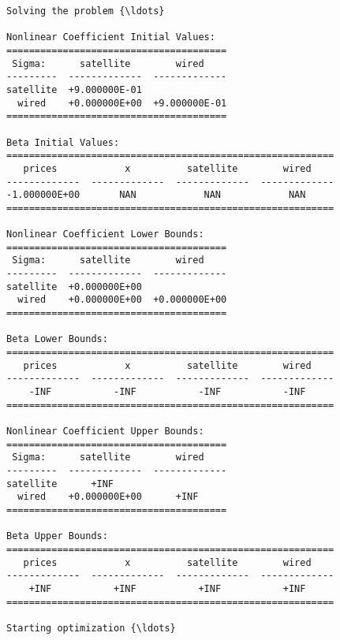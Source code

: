     \begin{Verbatim}[commandchars=\\\{\}]
Solving the problem {\ldots}

Nonlinear Coefficient Initial Values:
=======================================
 Sigma:      satellite        wired
---------  -------------  -------------
satellite  +9.000000E-01
  wired    +0.000000E+00  +9.000000E-01
=======================================

Beta Initial Values:
==========================================================
   prices            x          satellite        wired
-------------  -------------  -------------  -------------
-1.000000E+00       NAN            NAN            NAN
==========================================================

Nonlinear Coefficient Lower Bounds:
=======================================
 Sigma:      satellite        wired
---------  -------------  -------------
satellite  +0.000000E+00
  wired    +0.000000E+00  +0.000000E+00
=======================================

Beta Lower Bounds:
==========================================================
   prices            x          satellite        wired
-------------  -------------  -------------  -------------
    -INF           -INF           -INF           -INF
==========================================================

Nonlinear Coefficient Upper Bounds:
=======================================
 Sigma:      satellite        wired
---------  -------------  -------------
satellite      +INF
  wired    +0.000000E+00      +INF
=======================================

Beta Upper Bounds:
==========================================================
   prices            x          satellite        wired
-------------  -------------  -------------  -------------
    +INF           +INF           +INF           +INF
==========================================================

Starting optimization {\ldots}


\end{Verbatim}
